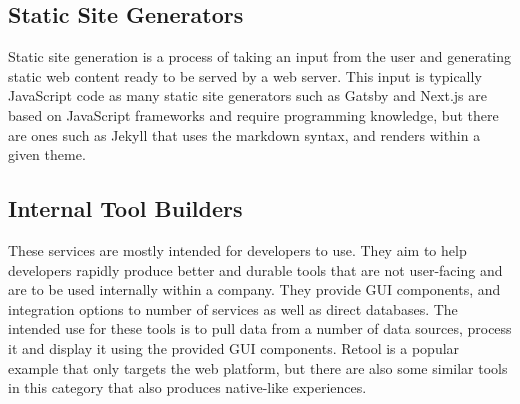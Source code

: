 \subsection{Static Site Generators}

Static site generation is a process of taking an input from the user and generating static web content ready to be served by a web server. This input is typically JavaScript code as many static site generators such as Gatsby \cite{Gatsby} and Next.js \cite{Nextjs} are based on JavaScript frameworks and require programming knowledge, but there are ones such as Jekyll \cite{Jekyll} that uses the markdown syntax, and renders within a given theme.

\subsection{Internal Tool Builders}

These services are mostly intended for developers to use. They aim to help developers rapidly produce better and durable tools that are not user-facing and are to be used internally within a company. They provide GUI components, and integration options to number of services as well as direct databases. The intended use for these tools is to pull data from a number of data sources, process it and display it using the provided GUI components. Retool \cite{Retool} is a popular example that only targets the web platform, but there are also some similar tools in this category that also produces native-like experiences.
